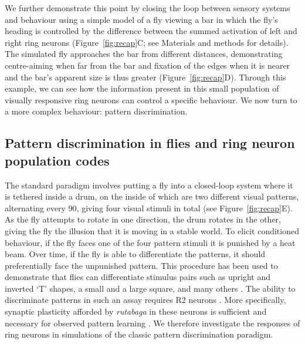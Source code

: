 We further demonstrate this point by closing the loop between sensory systems and behaviour using a simple model of a fly viewing a bar in which the fly’s heading is controlled by the difference between the summed activation of left and right ring neurons (Figure~\ref{fig:recap}C; see Materials and methods for details). The simulated fly approaches the bar from different distances, demonstrating centre-aiming when far from the bar and fixation of the edges when it is nearer and the bar’s apparent size is thus greater (Figure~\ref{fig:recap}D). Through this example, we can see how the information present in this small population of visually responsive ring neurons can control a specific behaviour. We now turn to a more complex behaviour: pattern discrimination. 

\subsection*{Pattern discrimination in flies and ring neuron population codes}
The standard paradigm involves putting a fly into a closed-loop system where it is tethered inside a drum, on the inside of which are two different visual patterns, alternating every 90\degree, giving four visual stimuli in total \cite{Dill1993,Ernst1999,Liu2006,Pan2009} (see Figure~\ref{fig:recap}E). As the fly attempts to rotate in one direction, the drum rotates in the other, giving the fly the illusion that it is moving in a stable world. To elicit conditioned behaviour, if the fly faces one of the four pattern stimuli it is punished by a heat beam. Over time, if the fly is able to differentiate the patterns, it should preferentially face the unpunished pattern. This procedure has been used to demonstrate that flies can differentiate stimulus pairs such as upright and inverted `T' shapes, a small and a large square, and many others \cite{Ernst1999}. The ability to discriminate patterns in such an assay requires R2 neurons \cite{Ernst1999,Liu2006,Wang2008}. More specifically, synaptic plasticity afforded by \emph{rutabaga} in these neurons is sufficient and necessary for observed pattern learning \cite{Pan2009}. We therefore investigate the responses of ring neurons in simulations of the classic pattern discrimination paradigm.

